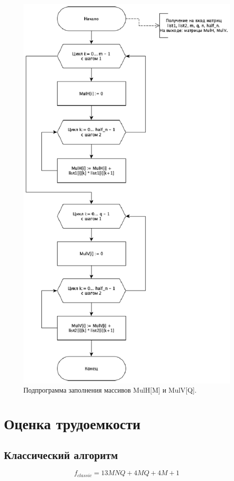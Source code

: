 \documentclass[12pt]{report}
\begin{document}
\begin{figure}[H]
	\centering
	\includegraphics[width=0.8\linewidth]{optymize_grape_MulHV}
	\caption{Подпрограмма заполнения массивов MulH[M] и MulV[Q].}
	\label{ris:image10}
\end{figure}

	\section{Оценка трудоемкости}
	\subsection{Классический алгоритм}
	\begin{equation}
	\label{complex_classic}
	f_{classic} = 13MNQ + 4MQ + 4M + 1
	\end{equation}
	
\end{document}
